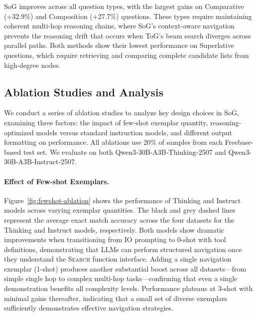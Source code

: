 \documentclass[sigconf]{acmart}
\begin{document}
SoG improves across all question types, with the largest gains on Comparative (+32.9\%) and Composition (+27.7\%) questions. These types require maintaining coherent multi-hop reasoning chains, where SoG's context-aware navigation prevents the reasoning drift that occurs when ToG's beam search diverges across parallel paths. Both methods show their lowest performance on Superlative questions, which require retrieving and comparing complete candidate lists from high-degree nodes.

\subsection{Ablation Studies and Analysis}
\label{sec:ablation}
We conduct a series of ablation studies to analyze key design choices in SoG, examining three factors: the impact of few-shot exemplar quantity, reasoning-optimized models versus standard instruction models, and different output formatting on performance. All ablations use 20\% of samples from each Freebase-based test set. We evaluate on both Qwen3-30B-A3B-Thinking-2507 and Qwen3-30B-A3B-Instruct-2507.




\paragraph{Effect of Few-shot Exemplars.}
Figure~\ref{fig:fewshot-ablation} shows the performance of Thinking and Instruct models across varying exemplar quantities. The black and grey dashed lines represent the average exact match accuracy across the four datasets for the Thinking and Instruct models, respectively. Both models show dramatic improvements when transitioning from IO prompting to 0-shot with tool definitions, demonstrating that LLMs can perform structured navigation once they understand the \textsc{Search} function interface. Adding a single navigation exemplar (1-shot) produces another substantial boost across all datasets---from simple single hop to complex multi-hop tasks---confirming that even a single demonstration benefits all complexity levels. Performance plateaus at 3-shot with minimal gains thereafter, indicating that a small set of diverse exemplars sufficiently demonstrates effective navigation strategies.
\end{document}
